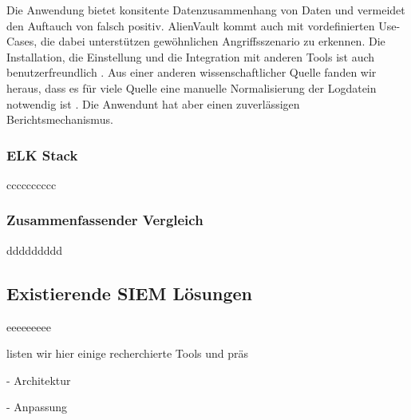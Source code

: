 Die Anwendung bietet konsitente Datenzusammenhang von Daten und vermeidet den Auftauch von \gls{falsch positiv}. AlienVault kommt auch mit vordefinierten Use-Cases, die dabei unterstützen gewöhnlichen Angriffsszenario zu erkennen. Die Installation, die Einstellung und die Integration mit anderen Tools ist auch benutzerfreundlich \citep{Gomes_AV}. Aus einer anderen wissenschaftlicher Quelle fanden wir heraus, dass es für viele  Quelle eine manuelle Normalisierung der Logdatein notwendig ist \cite{Nabil_AV}. Die Anwendunt hat aber einen zuverlässigen Berichtsmechanismus.


\subsubsection{ELK Stack}
cccccccccc

\subsubsection{Zusammenfassender Vergleich}
ddddddddd

\subsection{Existierende SIEM Lösungen}
eeeeeeeee

listen wir hier einige recherchierte Tools und präs






- Architektur %

- Anpassung %









